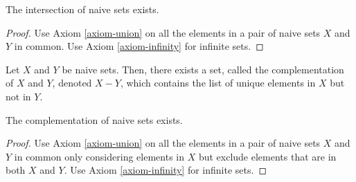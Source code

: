 \begin{lemma}
	\label{lemma-intersection-exists}
	The intersection of naive sets exists.
\end{lemma}

\begin{proof}
	Use Axiom \ref{axiom-union} on all the elements in a pair of naive sets $X$ and $Y$ in common. Use Axiom \ref{axiom-infinity} for infinite sets.
\end{proof}

\begin{definition}
	Let $X$ and $Y$ be naive sets.
	Then, there exists a set, called the complementation of $X$ and $Y$, denoted $X - Y$, which contains the list of unique elements in $X$ but not in $Y$. 
\end{definition}

\begin{lemma}
	\label{lemma-complementation-exists}
	The complementation of naive sets exists.
\end{lemma}

\begin{proof}
	Use Axiom \ref{axiom-union} on all the elements in a pair of naive sets $X$ and $Y$ in common only considering elements in $X$ but exclude elements that are in both $X$ and $Y$. Use Axiom \ref{axiom-infinity} for infinite sets.
\end{proof}